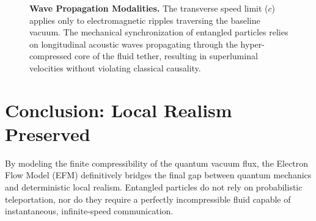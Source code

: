 \documentclass[11pt, a4paper]{article}
\begin{document}
  \begin{figure}[!ht]
    \centering
    \caption{\textbf{Wave Propagation Modalities.} The transverse speed limit ($c$) applies only to electromagnetic ripples traversing the baseline vacuum. The mechanical synchronization of entangled particles relies on longitudinal acoustic waves propagating through the hyper-compressed core of the fluid tether, resulting in superluminal velocities without violating classical causality.}
    \label{fig:wave_modalities}
  \end{figure}

\clearpage
\section{Conclusion: Local Realism Preserved}
  By modeling the finite compressibility of the quantum vacuum flux, the Electron Flow Model (EFM) definitively bridges the final gap between quantum mechanics and deterministic local realism. Entangled particles do not rely on probabilistic teleportation, nor do they require a perfectly incompressible fluid \cite{marabut2026m7} capable of instantaneous, infinite-speed communication.
\end{document}
